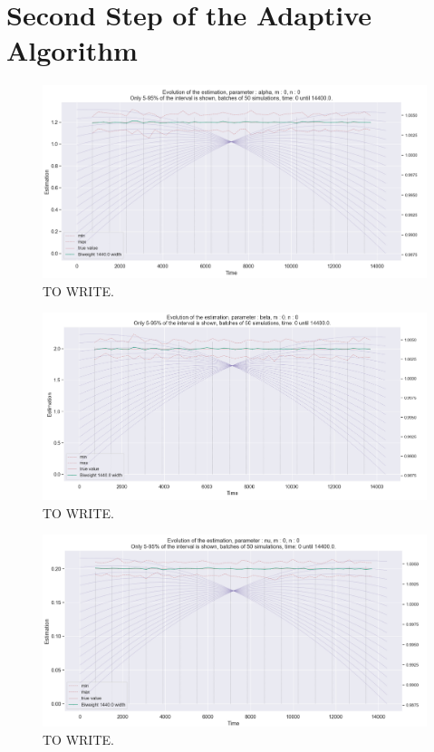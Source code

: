 \newpage
\section{Second Step of the Adaptive Algorithm}






\begin{figure}
\centering
\includegraphics[width = 0.90 \textwidth]{../imag/chap3/0/Figure_10.png}
\caption{TO WRITE.}
\label{fig:second_estimate_0_alpha}
\end{figure}

\begin{figure}
\centering
\includegraphics[width = 0.90 \textwidth]{../imag/chap3/0/Figure_11.png}
\caption{TO WRITE.}
\label{fig:second_estimate_0_beta}
\end{figure}

\begin{figure}
\centering
\includegraphics[width = 0.90 \textwidth]{../imag/chap3/0/Figure_12.png}
\caption{TO WRITE.}
\label{fig:second_estimate_0_nu}
\end{figure}




















